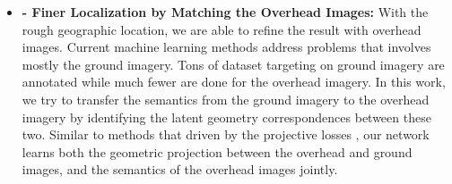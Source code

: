 \begin{itemize}[noitemsep]
  \item \textbf{ -
  Finer Localization by Matching the Overhead Images:} \newline \newline
  With the rough geographic location, we are able to refine the result
  with overhead images.
  Current machine learning methods address problems that involves mostly
  the ground imagery. Tons of dataset targeting on ground imagery are
  annotated while much fewer are done for the overhead imagery.
  In this work, we try to transfer the semantics from the ground imagery
  to the overhead imagery by identifying the latent geometry
  correspondences between these two. Similar to methods that driven by
  the projective losses , our network learns 
  both the geometric projection between the overhead and ground
  images, and the semantics of the overhead images jointly. \newline


\end{itemize}
